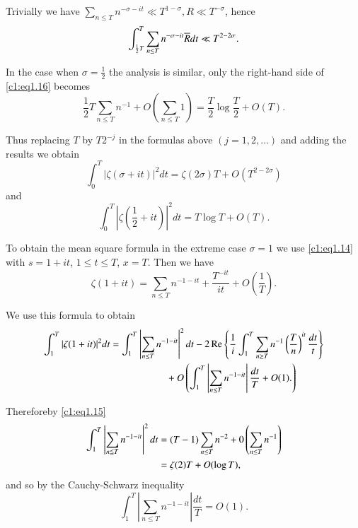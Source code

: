 Trivially we have $\displaystyle{\sum_{n \leq T} n^{- \sigma -
    it } \ll T^{1 -\sigma}, R\ll T^{- \sigma}}$, hence 
$$
\int^T_{\frac{1}{2} T} \sum_{n \leq T} n^{- \sigma - it } \overline{R}
dt \ll T^{2- 2 \sigma}.
$$

In the case when $\sigma = \frac{1}{2}$ the analysis is similar, only
the right-hand side of \eqref{c1:eq1.16} becomes
$$
\frac{1}{2} T \sum_{n \leq T} n^{-1} + O \left(\sum_{n \leq T} 1
\right) = \frac{T}{2} \log \frac{T}{2} + O (T).
$$

Thus replacing $T$ by $T 2^{-j}$ in the formulas above $(j = 1, 2,
\ldots)$ and adding the results we obtain
$$
\int^T_{0} |\zeta (\sigma + it )|^2 dt = \zeta (2 \sigma)T + O
(T^{2- 2 \sigma})
$$
and 
$$
\int^T_{0} |\zeta (\frac{1}{2} + it )|^2 dt = T \log T + O (T).
$$

To obtain the mean square formula in the extreme case $\sigma =1$ we
use \eqref{c1:eq1.14} with $s=1 + it $, $1 \leq t \leq T$, $x =
T$. Then we have
$$
\zeta (1+ it ) = \sum_{n \leq T} n^{-1 -it } + \frac{T^{-
    it }}{it }+ O \left( \frac{1}{T}\right).
$$

We use this formula to obtain 
\begin{align}
\int^T_1 |\zeta (1+ it )|^2 dt & = \int^T_1 \left|\sum_{n \leq T}
n^{-1 - it }\right|^2 dt - 2 \operatorname{Re} \left\{\frac{1}{i} \int^T_1
\sum_{n \geq T} n^{-1} \left(\frac{T}{n}\right)^{it }
\frac{dt}{t} \right\}\notag\\ 
& \hspace{2cm}+ O \left(\int^T_1 \left|\sum_{n \leq T} n^{-1- it }\right|
\frac{dt}{T} + O (1). \right)\label{c1:eq1.17}
\end{align}

Therefore\pageoriginale by \eqref{c1:eq1.15}
\begin{align}
  \int^T_1 \left| \sum_{n \leqq T} n^{-1 - it }\right|^2 dt &
  =(T-1) \sum_{n \leq T} n^{-2} + 0 \left( \sum_{n \leq T}
  n^{-1}\right)\notag\\
  & =\zeta (2) T + O (\log T),\label{c1:eq1.18}
\end{align}
and so by the Cauchy-Schwarz inequality
$$
\int^T_1 \left|\sum_{n \leq T} n^{-1 - it }\right| \frac{dt}{T}
= O (1).
$$

